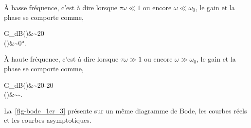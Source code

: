 \`A basse fréquence, c'est à dire lorsque $\tau\omega\ll1$ ou encore $\omega\ll\omega_0$, 
le gain et la phase se comporte comme, 
\begin{bequation}
    G_{dB}(\omega)&\sim20 \\
    \phi(\omega)&\sim0\si{\degree}.
\end{bequation} 

\`A haute fréquence, c'est à dire lorsque $\tau\omega\gg1$ ou encore $\omega\gg\omega_0$,
le gain et la phase se comporte comme,
\begin{bequation}
    G_{dB}(\omega)&\sim20-20 \\
    \phi(\omega)&\sim-.
\end{bequation} 
La~\cref{fig-bode_1er_3} présente sur un même diagramme de Bode, les courbes réels et les courbes asymptotiques.

